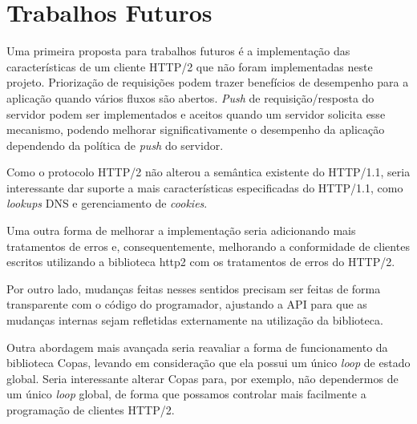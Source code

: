 \section{Trabalhos Futuros}
\label{sec:futurework}

Uma primeira proposta para trabalhos futuros é a implementação das características de um cliente HTTP/2 que não foram implementadas neste projeto. Priorização de requisições podem trazer benefícios de desempenho para a aplicação quando vários fluxos são abertos. {\em Push} de requisição\slash resposta do servidor podem ser implementados e aceitos quando um servidor solicita esse mecanismo, podendo melhorar significativamente o desempenho da aplicação dependendo da política de {\em push} do servidor.

Como o protocolo HTTP/2 não alterou a semântica existente do HTTP/1.1, seria interessante dar suporte a mais características especificadas do HTTP/1.1, como {\em lookups} DNS e gerenciamento de {\em cookies}.

Uma outra forma de melhorar a implementação seria adicionando mais tratamentos de erros e, consequentemente, melhorando a conformidade de clientes escritos utilizando a biblioteca http2 com os tratamentos de erros do HTTP/2.

Por outro lado, mudanças feitas nesses sentidos precisam ser feitas de forma transparente com o código do programador, ajustando a API para que as mudanças internas sejam refletidas externamente na utilização da biblioteca.

Outra abordagem mais avançada seria reavaliar a forma de funcionamento da biblioteca Copas, levando em consideração que ela possui um único {\em loop} de estado global. Seria interessante alterar Copas para, por exemplo, não dependermos de um único {\em loop} global, de forma que possamos controlar mais facilmente a programação de clientes HTTP/2.
